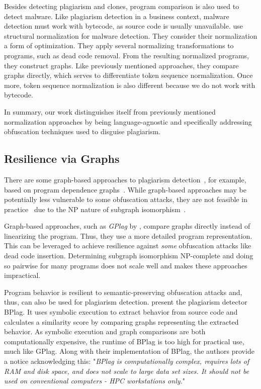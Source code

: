 Besides detecting plagiarism and clones, program comparison is also used to detect malware. Like plagiarism detection in a business context, malware detection must work with bytecode, as source code is usually unavailable. \citet{bruschi2007} use structural normalization for malware detection. They consider their normalization a form of optimization. They apply several normalizing transformations to programs, such as dead code removal. From the resulting normalized programs, they construct graphs. Like previously mentioned approaches, they compare graphs directly, which serves to differentiate token sequence normalization. Once more, token sequence normalization is also different because we do not work with bytecode.

In summary, our work distinguishes itself from previously mentioned normalization approaches by being language-agnostic and specifically addressing obfuscation techniques used to disguise plagiarism.

\subsection{Resilience via Graphs}
There are some graph-based approaches to plagiarism detection~\cite{Novak2019}, for example, based on program dependence graphs~\cite{ferrante1987}. While graph-based approaches may be potentially less vulnerable to some obfuscation attacks, they are not feasible in practice~\cite{liu2006} due to the NP nature of subgraph isomorphism~\cite{Shang2008, McCreesh2020, Lubiw1981}.

Graph-based approaches, such as \textit{GPlag} by \citet{liu2006}, compare graphs directly instead of linearizing the program. Thus, they use a more detailed program representation. This can be leveraged to achieve resilience against \textit{some} obfuscation attacks like dead code insertion.
Determining subgraph isomorphism NP-complete and doing so pairwise for many programs does not scale well and makes these approaches impractical.

Program behavior is resilient to semantic-preserving obfuscation attacks and, thus, can also be used for plagiarism detection.
\citet{cheers2021} present the plagiarism detector BPlag. It uses symbolic execution to extract behavior from source code and calculates a similarity score by comparing graphs representing the extracted behavior.
As symbolic execution and graph comparisons are both computationally expensive, the runtime of BPlag is too high for practical use, much like GPlag. Along with their implementation of BPlag, the authors provide a notice acknowledging this: "\textit{BPlag is computationally complex, requires lots of RAM and disk space, and does not scale to large data set sizes. It should not be used on conventional computers - HPC workstations only.}"~\cite{bplag-github}

